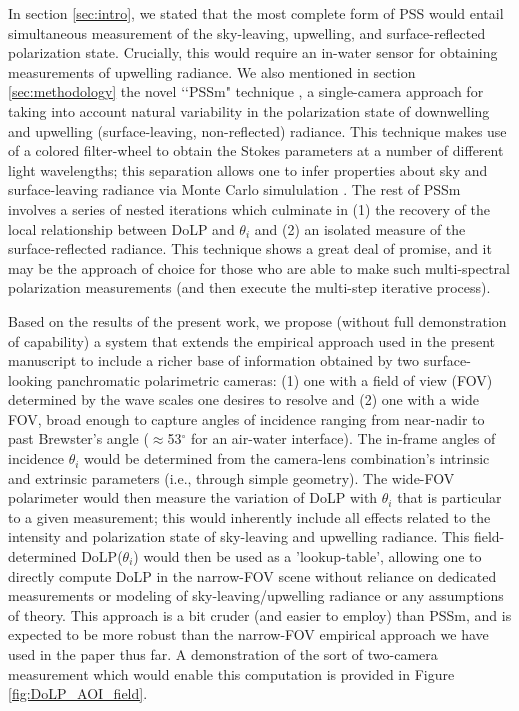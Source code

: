 \documentclass[letterpaper,journal]{IEEEtran}
\begin{document}
In section \ref{sec:intro}, we stated that the most complete form of PSS would entail simultaneous measurement of the sky-leaving, upwelling, and surface-reflected polarization state. Crucially, this would require an in-water sensor for obtaining measurements of upwelling radiance. We also mentioned in section \ref{sec:methodology} the novel \lq\lq PSSm" technique \cite{malinowski_surface_2024}, a single-camera approach for taking into account natural variability in the polarization state of downwelling and upwelling (surface-leaving, non-reflected) radiance. This technique makes use of a colored filter-wheel to obtain the Stokes parameters at a number of different light wavelengths; this separation allows one to infer properties about sky and surface-leaving radiance via Monte Carlo simululation \cite{foster_characterization_2015,foster_polarized_2016}. The rest of PSSm involves a series of nested iterations which culminate in (1) the recovery of the local relationship between DoLP and $\theta_i$ and (2) an isolated measure of the surface-reflected radiance. This technique shows a great deal of promise, and it may be the approach of choice for those who are able to make such multi-spectral polarization measurements (and then execute the multi-step iterative process).

Based on the results of the present work, we propose (without full demonstration of capability) a system that extends the empirical approach used in the present manuscript to include a richer base of information obtained by two surface-looking panchromatic polarimetric cameras: (1) one with a field of view (FOV) determined by the wave scales one desires to resolve and (2) one with a wide FOV, broad enough to capture angles of incidence ranging from near-nadir to past Brewster's angle ($\approx$53$^{\circ}$ for an air-water interface). The in-frame angles of incidence $\theta_i$ would be determined from the camera-lens combination's intrinsic and extrinsic parameters (i.e., through simple geometry). The wide-FOV polarimeter would then measure the variation of DoLP with $\theta_i$ that is particular to a given measurement; this would inherently include all effects related to the intensity and polarization state of sky-leaving and upwelling radiance. This field-determined DoLP($\theta_i$) would then be used as a 'lookup-table', allowing one to directly compute DoLP in the narrow-FOV scene without reliance on dedicated measurements or modeling of sky-leaving/upwelling radiance \cite{foster_characterization_2015,foster_polarized_2016} or any assumptions of theory. This approach is a bit cruder (and easier to employ) than PSSm, and is expected to be more robust than the narrow-FOV empirical approach we have used in the paper thus far. A demonstration of the sort of two-camera measurement which would enable this computation is provided in Figure \ref{fig:DoLP_AOI_field}.
\end{document}
